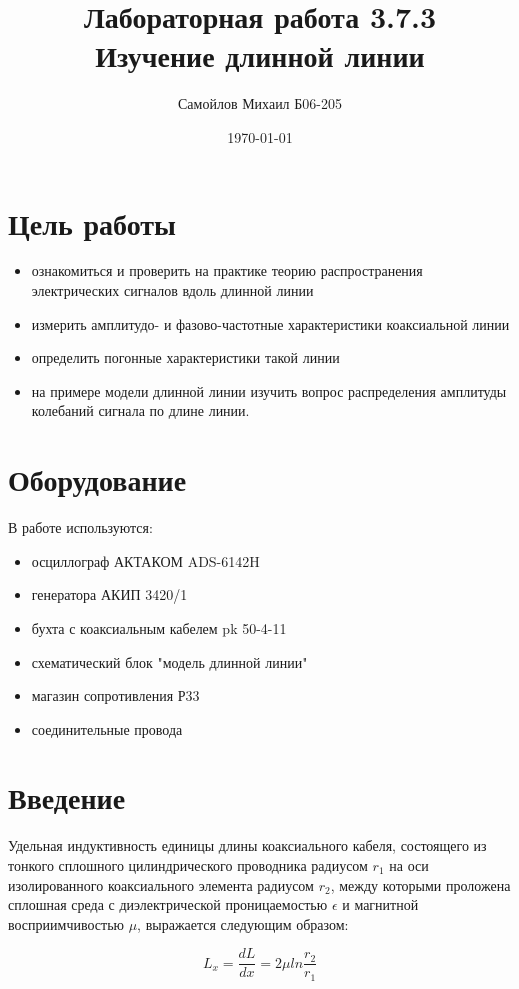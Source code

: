 \documentclass[a4paper,12pt]{article} %
\author{Самойлов Михаил Б06-205}
\title{Лабораторная работа 3.7.3 \\
	\textbf{Изучение длинной линии}}
\date{\today}
\begin{document}
\maketitle	

\section{Цель работы}

 \begin{itemize}
     \item ознакомиться и проверить на практике теорию распространения электрических сигналов вдоль длинной линии
     \item измерить амплитудо- и фазово-частотные
	характеристики коаксиальной линии
     \item определить погонные характеристики такой линии
     \item на примере модели длинной линии изучить вопрос распределения амплитуды колебаний сигнала по длине линии.
 \end{itemize}
 \section{Оборудование}

	В работе используются: 
 \begin{itemize}
     \item осциллограф АКТАКОМ ADS-6142H
     \item генератора АКИП 3420/1
     \item бухта с коаксиальным кабелем pk 50-4-11
     \item схематический блок "модель длинной линии"
     \item магазин сопротивления Р33
     \item соединительные провода
 \end{itemize}

\section{Введение}
Удельная индуктивность единицы длины коаксиального кабеля, состоящего из тонкого сплошного цилиндрического проводника радиусом $r_1$ на оси изолированного коаксиального элемента радиусом $r_2$, между которыми проложена сплошная среда с диэлектрической проницаемостью $\epsilon$ и магнитной восприимчивостью $\mu$, выражается следующим образом:

\begin{equation}
    L_x = \frac{dL}{dx} = 2\mu ln \frac{r_2}{r_1}
\end{equation}
\end{document}
